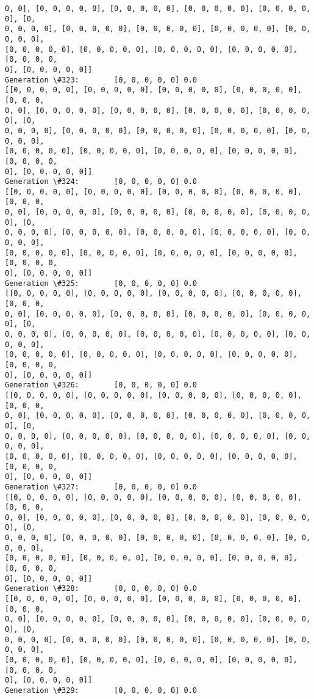 \documentclass[11pt]{article}
\begin{document}
\begin{Verbatim}[commandchars=\\\{\}]
0, 0], [0, 0, 0, 0, 0], [0, 0, 0, 0, 0], [0, 0, 0, 0, 0], [0, 0, 0, 0, 0], [0,
0, 0, 0, 0], [0, 0, 0, 0, 0], [0, 0, 0, 0, 0], [0, 0, 0, 0, 0], [0, 0, 0, 0, 0],
[0, 0, 0, 0, 0], [0, 0, 0, 0, 0], [0, 0, 0, 0, 0], [0, 0, 0, 0, 0], [0, 0, 0, 0,
0], [0, 0, 0, 0, 0]]
Generation \#323:        [0, 0, 0, 0, 0] 0.0
[[0, 0, 0, 0, 0], [0, 0, 0, 0, 0], [0, 0, 0, 0, 0], [0, 0, 0, 0, 0], [0, 0, 0,
0, 0], [0, 0, 0, 0, 0], [0, 0, 0, 0, 0], [0, 0, 0, 0, 0], [0, 0, 0, 0, 0], [0,
0, 0, 0, 0], [0, 0, 0, 0, 0], [0, 0, 0, 0, 0], [0, 0, 0, 0, 0], [0, 0, 0, 0, 0],
[0, 0, 0, 0, 0], [0, 0, 0, 0, 0], [0, 0, 0, 0, 0], [0, 0, 0, 0, 0], [0, 0, 0, 0,
0], [0, 0, 0, 0, 0]]
Generation \#324:        [0, 0, 0, 0, 0] 0.0
[[0, 0, 0, 0, 0], [0, 0, 0, 0, 0], [0, 0, 0, 0, 0], [0, 0, 0, 0, 0], [0, 0, 0,
0, 0], [0, 0, 0, 0, 0], [0, 0, 0, 0, 0], [0, 0, 0, 0, 0], [0, 0, 0, 0, 0], [0,
0, 0, 0, 0], [0, 0, 0, 0, 0], [0, 0, 0, 0, 0], [0, 0, 0, 0, 0], [0, 0, 0, 0, 0],
[0, 0, 0, 0, 0], [0, 0, 0, 0, 0], [0, 0, 0, 0, 0], [0, 0, 0, 0, 0], [0, 0, 0, 0,
0], [0, 0, 0, 0, 0]]
Generation \#325:        [0, 0, 0, 0, 0] 0.0
[[0, 0, 0, 0, 0], [0, 0, 0, 0, 0], [0, 0, 0, 0, 0], [0, 0, 0, 0, 0], [0, 0, 0,
0, 0], [0, 0, 0, 0, 0], [0, 0, 0, 0, 0], [0, 0, 0, 0, 0], [0, 0, 0, 0, 0], [0,
0, 0, 0, 0], [0, 0, 0, 0, 0], [0, 0, 0, 0, 0], [0, 0, 0, 0, 0], [0, 0, 0, 0, 0],
[0, 0, 0, 0, 0], [0, 0, 0, 0, 0], [0, 0, 0, 0, 0], [0, 0, 0, 0, 0], [0, 0, 0, 0,
0], [0, 0, 0, 0, 0]]
Generation \#326:        [0, 0, 0, 0, 0] 0.0
[[0, 0, 0, 0, 0], [0, 0, 0, 0, 0], [0, 0, 0, 0, 0], [0, 0, 0, 0, 0], [0, 0, 0,
0, 0], [0, 0, 0, 0, 0], [0, 0, 0, 0, 0], [0, 0, 0, 0, 0], [0, 0, 0, 0, 0], [0,
0, 0, 0, 0], [0, 0, 0, 0, 0], [0, 0, 0, 0, 0], [0, 0, 0, 0, 0], [0, 0, 0, 0, 0],
[0, 0, 0, 0, 0], [0, 0, 0, 0, 0], [0, 0, 0, 0, 0], [0, 0, 0, 0, 0], [0, 0, 0, 0,
0], [0, 0, 0, 0, 0]]
Generation \#327:        [0, 0, 0, 0, 0] 0.0
[[0, 0, 0, 0, 0], [0, 0, 0, 0, 0], [0, 0, 0, 0, 0], [0, 0, 0, 0, 0], [0, 0, 0,
0, 0], [0, 0, 0, 0, 0], [0, 0, 0, 0, 0], [0, 0, 0, 0, 0], [0, 0, 0, 0, 0], [0,
0, 0, 0, 0], [0, 0, 0, 0, 0], [0, 0, 0, 0, 0], [0, 0, 0, 0, 0], [0, 0, 0, 0, 0],
[0, 0, 0, 0, 0], [0, 0, 0, 0, 0], [0, 0, 0, 0, 0], [0, 0, 0, 0, 0], [0, 0, 0, 0,
0], [0, 0, 0, 0, 0]]
Generation \#328:        [0, 0, 0, 0, 0] 0.0
[[0, 0, 0, 0, 0], [0, 0, 0, 0, 0], [0, 0, 0, 0, 0], [0, 0, 0, 0, 0], [0, 0, 0,
0, 0], [0, 0, 0, 0, 0], [0, 0, 0, 0, 0], [0, 0, 0, 0, 0], [0, 0, 0, 0, 0], [0,
0, 0, 0, 0], [0, 0, 0, 0, 0], [0, 0, 0, 0, 0], [0, 0, 0, 0, 0], [0, 0, 0, 0, 0],
[0, 0, 0, 0, 0], [0, 0, 0, 0, 0], [0, 0, 0, 0, 0], [0, 0, 0, 0, 0], [0, 0, 0, 0,
0], [0, 0, 0, 0, 0]]
Generation \#329:        [0, 0, 0, 0, 0] 0.0

\end{Verbatim}
\end{document}
